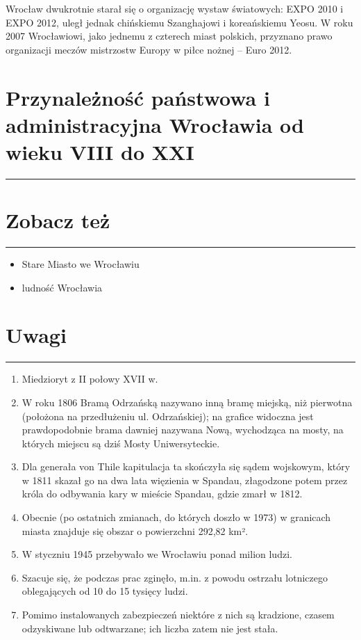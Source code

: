 \documentclass{article}
\begin{document}
Wrocław dwukrotnie starał się o organizację wystaw światowych: EXPO 2010 i EXPO 2012, uległ jednak chińskiemu Szanghajowi i koreańskiemu Yeosu. W roku 2007 Wrocławiowi, jako jednemu z czterech miast polskich, przyznano prawo organizacji meczów mistrzostw Europy w piłce nożnej – Euro 2012.

\section{Przynależność państwowa i administracyjna Wrocławia od wieku VIII do XXI}
\noindent\rule{\textwidth}{0.4pt}

\section{Zobacz też}

\noindent\rule{\textwidth}{0.4pt}
\begin{itemize}
    \item Stare Miasto we Wrocławiu
    \item ludność Wrocławia
\end{itemize}

\section{Uwagi}
\noindent\rule{\textwidth}{0.4pt}

\begin{enumerate} \scriptsize
    \renewcommand{\labelenumi}{\alph{enumi}}
        \item \hypertarget{a}{Miedzioryt z II połowy XVII w.}
        \item \hypertarget{b}{W roku 1806 Bramą Odrzańską nazywano inną bramę miejską, niż pierwotna (położona na przedłużeniu ul. Odrzańskiej); na grafice widoczna jest prawdopodobnie brama dawniej nazywana Nową, wychodząca na mosty, na których miejscu są dziś Mosty Uniwersyteckie.}
        \item \hypertarget{c}{Dla generała von Thile kapitulacja ta skończyła się sądem wojskowym, który w 1811 skazał go na dwa lata więzienia w Spandau, złagodzone potem przez króla do odbywania kary w mieście Spandau, gdzie zmarł w 1812.}
        \item \hypertarget{d}{Obecnie (po ostatnich zmianach, do których doszło w 1973) w granicach miasta znajduje się obszar o powierzchni 292,82 km².}
        \item \hypertarget{e}{W styczniu 1945 przebywało we Wrocławiu ponad milion ludzi.}
        \item \hypertarget{f}{Szacuje się, że podczas prac zginęło, m.in. z powodu ostrzału lotniczego oblegających od 10 do 15 tysięcy ludzi.}
        \item \hypertarget{g}{Pomimo instalowanych zabezpieczeń niektóre z nich są kradzione, czasem odzyskiwane lub odtwarzane; ich liczba zatem nie jest stała.}
\end{enumerate}
\newpage
\end{document}
